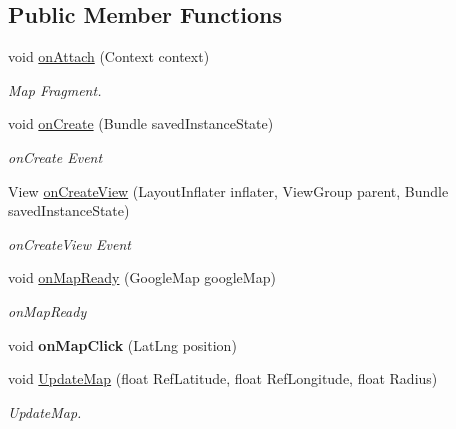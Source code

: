 \subsection*{Public Member Functions}
\begin{DoxyCompactItemize}
\item 
void \hyperlink{classedu_1_1tamu_1_1rfsignalmap_1_1_maps_view_fragment_af4d0951688a7b1c3dd8610b80f9e3121}{on\+Attach} (Context context)
\begin{DoxyCompactList}\small\item\em Map Fragment. \end{DoxyCompactList}\item 
void \hyperlink{classedu_1_1tamu_1_1rfsignalmap_1_1_maps_view_fragment_adc896ca074abf84cf2b9d6fc72f8eb85}{on\+Create} (Bundle saved\+Instance\+State)
\begin{DoxyCompactList}\small\item\em on\+Create Event \end{DoxyCompactList}\item 
View \hyperlink{classedu_1_1tamu_1_1rfsignalmap_1_1_maps_view_fragment_a3128669f79328504417a1ae6c87184d2}{on\+Create\+View} (Layout\+Inflater inflater, View\+Group parent, Bundle saved\+Instance\+State)
\begin{DoxyCompactList}\small\item\em on\+Create\+View Event \end{DoxyCompactList}\item 
void \hyperlink{classedu_1_1tamu_1_1rfsignalmap_1_1_maps_view_fragment_a650103568e6ec433aab779ae38c24458}{on\+Map\+Ready} (Google\+Map google\+Map)
\begin{DoxyCompactList}\small\item\em on\+Map\+Ready \end{DoxyCompactList}\item 
void {\bfseries on\+Map\+Click} (Lat\+Lng position)\hypertarget{classedu_1_1tamu_1_1rfsignalmap_1_1_maps_view_fragment_acd9ab237d27dfc41c96bd7cb5ef72ab2}{}\label{classedu_1_1tamu_1_1rfsignalmap_1_1_maps_view_fragment_acd9ab237d27dfc41c96bd7cb5ef72ab2}

\item 
void \hyperlink{classedu_1_1tamu_1_1rfsignalmap_1_1_maps_view_fragment_ab6cfd6c5b2757395c2c71c1e34fe60e1}{Update\+Map} (float Ref\+Latitude, float Ref\+Longitude, float Radius)
\begin{DoxyCompactList}\small\item\em Update\+Map. \end{DoxyCompactList}\end{DoxyCompactItemize}


